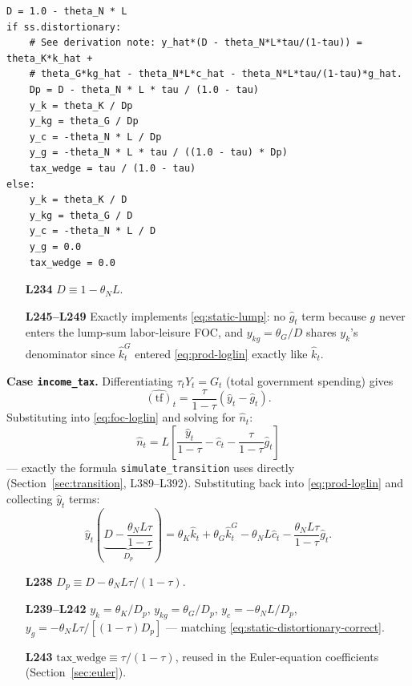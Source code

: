 \documentclass[11pt]{article}
\newcommand{\eq}[1]{\begin{equation}#1\end{equation}}
\begin{document}
\begin{lstlisting}[firstnumber=234]
D = 1.0 - theta_N * L
if ss.distortionary:
    # See derivation note: y_hat*(D - theta_N*L*tau/(1-tau)) = theta_K*k_hat +
    # theta_G*kg_hat - theta_N*L*c_hat - theta_N*L*tau/(1-tau)*g_hat.
    Dp = D - theta_N * L * tau / (1.0 - tau)
    y_k = theta_K / Dp
    y_kg = theta_G / Dp
    y_c = -theta_N * L / Dp
    y_g = -theta_N * L * tau / ((1.0 - tau) * Dp)
    tax_wedge = tau / (1.0 - tau)
else:
    y_k = theta_K / D
    y_kg = theta_G / D
    y_c = -theta_N * L / D
    y_g = 0.0
    tax_wedge = 0.0
\end{lstlisting}
\begin{itemize}
\item[\textbf{L234}] $D\equiv1-\theta_N L$.
\item[\textbf{L245--L249}] Exactly implements \eqref{eq:static-lump}: no
$\hat g_t$ term because $g$ never enters the lump-sum labor-leisure FOC,
and $y_{kg}=\theta_G/D$ shares $y_k$'s denominator since $\hat k^G_t$
entered \eqref{eq:prod-loglin} exactly like $\hat k_t$.
\end{itemize}

\textbf{Case \texttt{income\_tax}.} Differentiating $\tau_tY_t=G_t$
(total government spending) gives
\eq{ \widehat{(\text{tf})}_t=\frac{\tau}{1-\tau}(\hat y_t-\hat g_t). \label{eq:tauhat} }
Substituting into \eqref{eq:foc-loglin} and solving for $\hat n_t$:
\eq{ \hat n_t = L\left[\frac{\hat y_t}{1-\tau}-\hat c_t-\frac{\tau}{1-\tau}\hat g_t\right] \label{eq:n-distortionary} }
--- exactly the formula \texttt{simulate\_transition} uses directly
(Section~\ref{sec:transition}, L389--L392). Substituting back into
\eqref{eq:prod-loglin} and collecting $\hat y_t$ terms:
\eq{
\hat y_t\left(\underbrace{D-\frac{\theta_N L\tau}{1-\tau}}_{\displaystyle D_p}\right)
   = \theta_K\hat k_t+\theta_G\hat k^G_t-\theta_N L\hat c_t-\frac{\theta_N L\tau}{1-\tau}\hat g_t.
   \label{eq:static-distortionary-correct}
}
\begin{itemize}
\item[\textbf{L238}] $D_p\equiv D-\theta_N L\tau/(1-\tau)$.
\item[\textbf{L239--L242}] $y_k=\theta_K/D_p$, $y_{kg}=\theta_G/D_p$,
$y_c=-\theta_N L/D_p$, $y_g=-\theta_N L\tau/[(1-\tau)D_p]$ --- matching
\eqref{eq:static-distortionary-correct}.
\item[\textbf{L243}] $\text{tax\_wedge}\equiv\tau/(1-\tau)$, reused in the
Euler-equation coefficients (Section~\ref{sec:euler}).
\end{itemize}
\end{document}
